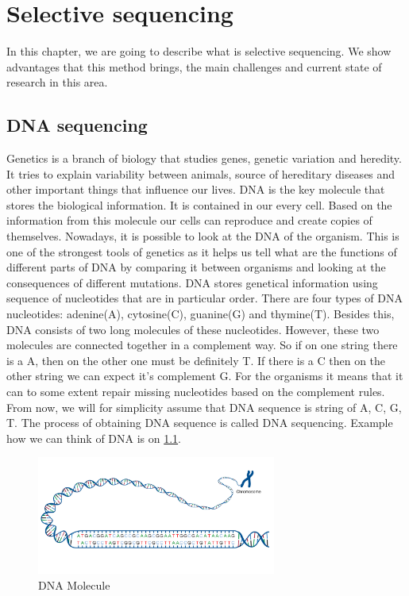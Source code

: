 \chapter{Selective sequencing}

\label{kap:selSeq} %

In this chapter, we are going to describe what is selective sequencing. We
show advantages that this method brings, the main challenges and current state of
research in this area.

\section{DNA sequencing}

Genetics is a branch of biology that studies genes, genetic variation and heredity.
It tries to explain variability between animals, source of hereditary diseases and
other important things that influence our lives. DNA is the key molecule
that stores the biological information. It is contained in our every cell. Based
on the information from this molecule our cells can reproduce and create copies of
themselves. Nowadays, it is possible to look at the DNA of the organism. This is
one of the strongest tools of genetics as it helps us tell what are the functions
of different parts of DNA by comparing it between organisms and looking at the
consequences of different mutations. DNA stores genetical information using sequence of
nucleotides that are in particular order. There are four types of DNA nucleotides:
adenine(A), cytosine(C), guanine(G) and thymine(T). Besides this, DNA consists of two long
molecules of these nucleotides. However, these two molecules are connected together
in a complement way. So if on one string there is a A, then on the other
one must be definitely T. If there is a C then on the other string we can expect
it's complement G. For the organisms it means that it can to some extent repair
missing nucleotides based on the complement rules. From now, we will for simplicity
assume that DNA sequence is string of A, C, G, T. The process of obtaining DNA
sequence is called DNA sequencing. Example how we can think of DNA is on \ref{obr:acgt}.


\begin{figure}
\centerline{\includegraphics[width=0.7\textwidth, height=0.3\textheight]{images/acgt}}
\caption[DNA]{DNA Molecule}
\label{obr:acgt}
\end{figure}

